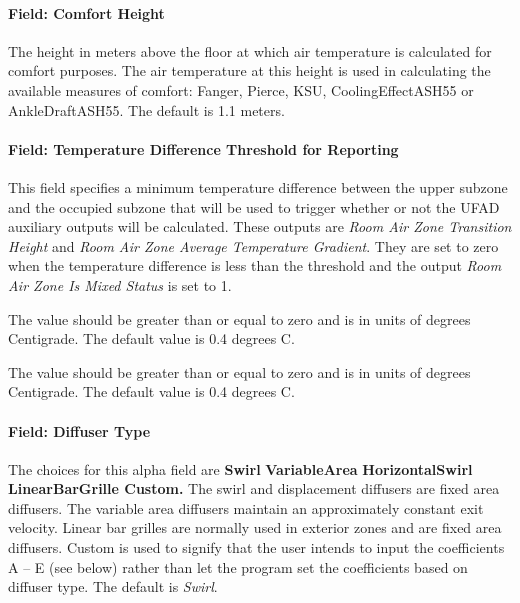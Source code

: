 \paragraph{Field: Comfort Height}\label{field-comfort-height-2}

The height in meters above the floor at which air temperature is calculated for comfort purposes. The air temperature at this height is used in calculating the available measures of comfort: Fanger, Pierce, KSU, CoolingEffectASH55 or AnkleDraftASH55. The default is 1.1 meters.

\paragraph{Field: Temperature Difference Threshold for Reporting}\label{field-temperature-difference-threshold-for-reporting-2}

This field specifies a minimum temperature difference between the upper subzone and the occupied subzone that will be used to trigger whether or not the UFAD auxiliary outputs will be calculated. These outputs are \emph{Room Air Zone Transition Height} and \emph{Room Air Zone Average Temperature Gradient}. They are set to zero when the temperature difference is less than the threshold and the output \emph{Room Air Zone Is Mixed Status} is set to 1.

The value should be greater than or equal to zero and is in units of degrees Centigrade. The default value is 0.4 degrees C.

The value should be greater than or equal to zero and is in units of degrees Centigrade. The default value is 0.4 degrees C.

\paragraph{Field: Diffuser Type}\label{field-diffuser-type-1}

The choices for this alpha field are \textbf{Swirl} \textbar{} \textbf{VariableArea} \textbar{} \textbf{HorizontalSwirl \textbar{} LinearBarGrille \textbar{} Custom.} The swirl and displacement diffusers are fixed area diffusers. The variable area diffusers maintain an approximately constant exit velocity. Linear bar grilles are normally used in exterior zones and are fixed area diffusers. Custom is used to signify that the user intends to input the coefficients A -- E (see below) rather than let the program set the coefficients based on diffuser type. The default is \emph{Swirl}.

